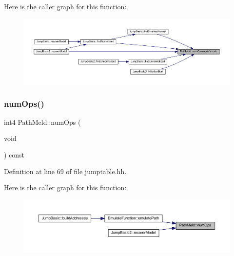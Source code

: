 Here is the caller graph for this function\+:
\nopagebreak
\begin{figure}[H]
\begin{center}
\leavevmode
\includegraphics[width=350pt]{class_path_meld_a62cd3e5f48e44c7f91ae528d9226125c_icgraph}
\end{center}
\end{figure}
\mbox{\label{class_path_meld_ac5bbe9f261e99d4b5b946c85680e4d10}} 
\subsubsection{\texorpdfstring{numOps()}{numOps()}}
{\footnotesize\ttfamily int4 Path\+Meld\+::num\+Ops (\begin{DoxyParamCaption}\item[{void}]{ }\end{DoxyParamCaption}) const\hspace{0.3cm}{\ttfamily [inline]}}



Definition at line 69 of file jumptable.\+hh.

Here is the caller graph for this function\+:
\nopagebreak
\begin{figure}[H]
\begin{center}
\leavevmode
\includegraphics[width=350pt]{class_path_meld_ac5bbe9f261e99d4b5b946c85680e4d10_icgraph}
\end{center}
\end{figure}
\mbox{\label{class_path_meld_a665ffb4a63f3c682f3b7a945069be46b}} 
